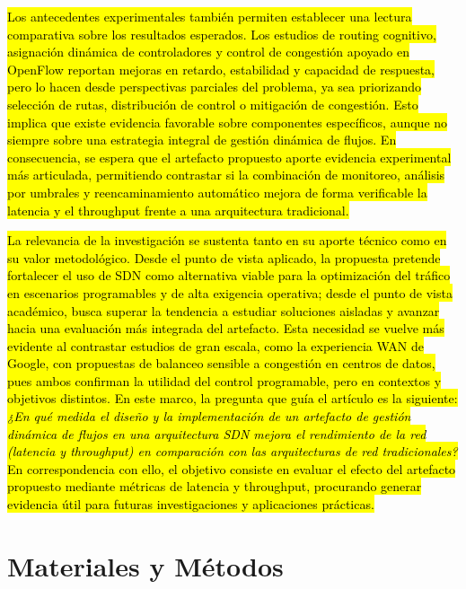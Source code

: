 \documentclass[12pt,a4paper]{article}
\newcommand{\introhl}[2]{%
    {\sethlcolor{#1}\hl{#2}}%
}
\begin{document}
\introhl{introresults}{Los antecedentes experimentales también permiten establecer una lectura comparativa sobre los resultados esperados. Los estudios de routing cognitivo, asignación dinámica de controladores y control de congestión apoyado en OpenFlow reportan mejoras en retardo, estabilidad y capacidad de respuesta, pero lo hacen desde perspectivas parciales del problema, ya sea priorizando selección de rutas, distribución de control o mitigación de congestión. Esto implica que existe evidencia favorable sobre componentes específicos, aunque no siempre sobre una estrategia integral de gestión dinámica de flujos. En consecuencia, se espera que el artefacto propuesto aporte evidencia experimental más articulada, permitiendo contrastar si la combinación de monitoreo, análisis por umbrales y reencaminamiento automático mejora de forma verificable la latencia y el throughput frente a una arquitectura tradicional.} \parencite{cognitive_routing_sdn, controller_assignment_sdn, red_openflow_sdn}

\introhl{introimp}{La relevancia de la investigación se sustenta tanto en su aporte técnico como en su valor metodológico. Desde el punto de vista aplicado, la propuesta pretende fortalecer el uso de SDN como alternativa viable para la optimización del tráfico en escenarios programables y de alta exigencia operativa; desde el punto de vista académico, busca superar la tendencia a estudiar soluciones aisladas y avanzar hacia una evaluación más integrada del artefacto. Esta necesidad se vuelve más evidente al contrastar estudios de gran escala, como la experiencia WAN de Google, con propuestas de balanceo sensible a congestión en centros de datos, pues ambos confirman la utilidad del control programable, pero en contextos y objetivos distintos. En este marco, la pregunta que guía el artículo es la siguiente: \textit{¿En qué medida el diseño y la implementación de un artefacto de gestión dinámica de flujos en una arquitectura SDN mejora el rendimiento de la red (latencia y throughput) en comparación con las arquitecturas de red tradicionales?} En correspondencia con ello, el objetivo consiste en evaluar el efecto del artefacto propuesto mediante métricas de latencia y throughput, procurando generar evidencia útil para futuras investigaciones y aplicaciones prácticas.} \parencite{b4_google_sdn, congestion_lb_datacenter}

\section{Materiales y Métodos}
\end{document}
